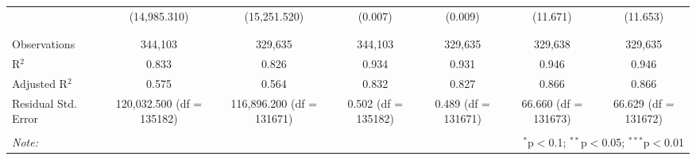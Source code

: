 \begin{table}[H]
{\begin{tabular}{@{\extracolsep{5pt}}lcccccc}
   & (14,985.310) & (15,251.520) & (0.007) & (0.009) & (11.671) & (11.653) \\  

   & & & & & & \\  

 \hline \\[-1.8ex]  

 Observations & 344,103 & 329,635 & 344,103 & 329,635 & 329,638 & 329,635 \\  

 R$^{2}$ & 0.833 & 0.826 & 0.934 & 0.931 & 0.946 & 0.946 \\  

 Adjusted R$^{2}$ & 0.575 & 0.564 & 0.832 & 0.827 & 0.866 & 0.866 \\  

 Residual Std. Error & 120,032.500 (df = 135182) & 116,896.200 (df = 131671) & 0.502 (df = 135182) & 0.489 (df = 131671) & 66.660 (df = 131673) & 66.629 (df = 131672) \\  

 \hline  

 \hline \\[-1.8ex]  

 \textit{Note:}  & \multicolumn{6}{r}{$^{*}$p$<$0.1; $^{**}$p$<$0.05; $^{***}$p$<$0.01} \\  

 \end{tabular}}  

 \end{table}  

 



